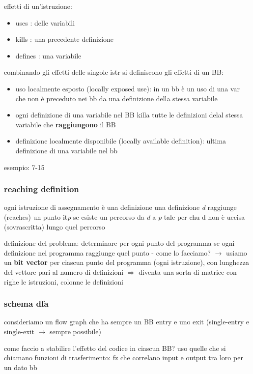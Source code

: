effetti di un'istruzione:
\begin{itemize}
  \item uses : delle variabili
  \item kills : una precedente definizione
  \item defines : una variabile
\end{itemize}
combinando gli effetti delle singole istr si definiscono gli effetti di un BB:
\begin{itemize}
  \item uso localmente esposto (locally exposed use): in un bb \`e un uso di una var che non \`e preceduto nei bb da una definizione della stessa variabile
  \item ogni definizione di una variabile nel BB killa tutte le definizioni delal stessa variabile che \textbf{raggiungono} il BB
  \item definizione localmente disponibile (locally available definition): ultima definizione di una variabile nel bb
\end{itemize}

esempio: 7-15

\subsubsection{reaching definition}

ogni istruzione di assegnamento \`e una definizione
una definizione \textit{d} raggiunge (reaches) un punto it\textit{p} se esiste un percorso da \textit{d} a \textit{p} tale per chu d non \`e uccisa (sovrascritta) lungo quel percorso

definizione del problema: determinare per ogni punto del programma se ogni definizione nel programma raggiunge quel punto - come lo facciamo? $\rightarrow$ usiamo un \textbf{bit vector} per ciascun punto del programma (ogni istruzione), con lunghezza del vettore pari al numero di definizioni $\Rightarrow$ diventa una sorta di matrice con righe le istruzioni, colonne le definizioni

\subsubsection{schema dfa}

consideriamo un flow graph che ha sempre un BB entry e uno exit (single-entry e single-exit $\rightarrow$ sempre possibile)

come faccio a stabilire l'effetto del codice in ciascun BB? uso quelle che si chiamano funzioni di trasferimento: fz che correlano input e output tra loro per un dato bb

